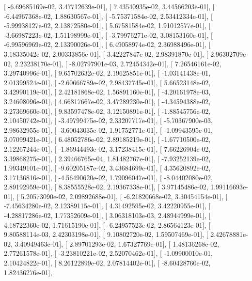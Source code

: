 \documentclass{article}
\begin{document}
       [ -6.69685169e-02,   3.47712639e-01],
       [  7.43540935e-02,   3.44566203e-01],
       [ -6.44967368e-02,   1.88630567e-01],
       [ -5.75371584e-02,   2.53412334e-01],
       [ -5.99938127e-02,   2.13872580e-01],
       [  5.67581584e-02,   1.91012577e-01],
       [ -3.66987223e-02,   1.51198999e-01],
       [ -3.79976271e-02,   3.08153160e-01],
       [ -6.99596969e-02,   2.13390026e-01],
       [  6.49058974e-02,   2.36988496e-01],
       [  3.18335042e-02,   2.00333856e-01],
       [  3.42227847e-02,   2.98391870e-01],
       [  2.96302709e-02,   2.23238170e-01],
       [ -8.02797901e-03,   2.72454342e-01],
       [  7.26546161e-02,   3.29740996e-01],
       [  9.65702632e-02,   2.19625851e-01],
       [ -1.03141438e-01,   2.01399524e-01],
       [ -2.60666789e-02,   2.98437745e-01],
       [  5.66523148e-02,   3.42990119e-01],
       [  2.42181868e-02,   1.56891160e-01],
       [ -4.20161978e-03,   3.24608096e-01],
       [  4.66817667e-02,   3.47289230e-01],
       [ -4.34594388e-02,   3.27369660e-01],
       [  9.83597478e-02,   3.12150891e-01],
       [ -1.88545756e-02,   2.10450742e-01],
       [ -3.49799475e-02,   2.33207717e-01],
       [ -5.70367900e-03,   2.98632955e-01],
       [ -3.60043035e-02,   1.91752771e-01],
       [ -1.09943595e-01,   3.07099421e-01],
       [  6.48052786e-02,   2.89185219e-01],
       [ -1.67710500e-02,   2.12267244e-01],
       [ -1.86944493e-02,   3.17238415e-01],
       [  7.66226904e-02,   3.39868275e-01],
       [  2.39466765e-04,   1.81482767e-01],
       [ -7.93252139e-02,   1.99349101e-01],
       [ -9.60205187e-02,   3.43684699e-01],
       [  4.35620892e-02,   3.17136816e-01],
       [ -4.56490620e-02,   1.79096047e-01],
       [ -8.04402080e-02,   2.89192959e-01],
       [  8.38555528e-02,   2.19367338e-01],
       [  3.97145486e-02,   1.99116693e-01],
       [  5.20573090e-02,   2.09892688e-01],
       [ -6.21820668e-02,   3.30454154e-01],
       [ -7.45634280e-02,   2.12389115e-01],
       [  4.31492595e-02,   3.42220955e-01],
       [ -4.28817286e-02,   1.77352609e-01],
       [  3.06318103e-03,   2.48944999e-01],
       [  4.18722360e-02,   1.71615190e-01],
       [ -6.24957523e-02,   2.86564123e-01],
       [  9.80588114e-03,   2.42303198e-01],
       [  9.10802720e-02,   1.59507469e-01],
       [  2.42678881e-02,   3.40949463e-01],
       [  2.89701293e-02,   1.67327769e-01],
       [  1.48136268e-02,   2.77261578e-01],
       [ -3.23810221e-02,   2.52070462e-01],
       [ -1.09900010e-01,   2.10424822e-01],
       [  8.26122899e-02,   2.07814402e-01],
       [ -8.60428760e-02,   1.82436276e-01],
\end{document}
